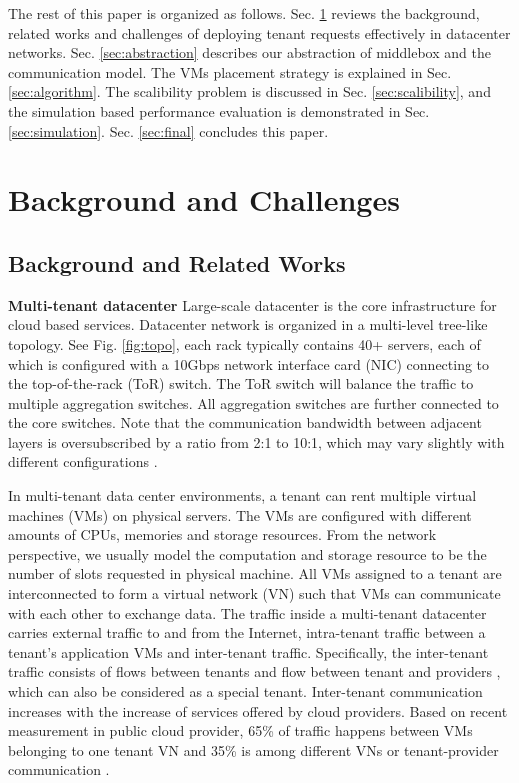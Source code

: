 \documentclass[review]{elsarticle}
\begin{document}
The rest of this paper is organized as follows. Sec. \ref{sec:background} reviews the background, related works and challenges of deploying tenant requests effectively in datacenter networks.
Sec. \ref{sec:abstraction} describes our abstraction of middlebox and the communication model. The VMs placement strategy is explained in Sec. \ref{sec:algorithm}. The scalibility problem is discussed in Sec. \ref{sec:scalibility}, and the simulation based performance evaluation is demonstrated in Sec. \ref{sec:simulation}. Sec. \ref{sec:final} concludes this paper.

\section{Background and Challenges}\label{sec:background}
\subsection{Background and Related Works}
\textbf{Multi-tenant datacenter }
Large-scale datacenter is the core infrastructure for cloud based services. Datacenter network is organized in a multi-level tree-like topology. See Fig. \ref{fig:topo}, each rack typically contains 40+ servers, each of which is configured with a 10Gbps network interface card (NIC) connecting to the top-of-the-rack (ToR) switch. The ToR switch will balance the traffic to multiple aggregation switches. All aggregation switches are further connected to the core switches. Note that the communication bandwidth between adjacent layers is oversubscribed by a ratio from 2:1 to 10:1, which may vary slightly with different configurations \cite{B13cta, williamson2010has}.

In multi-tenant data center environments, a tenant can rent multiple virtual machines (VMs) on physical servers. The VMs are configured with different amounts of CPUs, memories and storage resources. From the network perspective, we usually model the computation and storage resource to be the number of slots requested in physical machine. All VMs assigned to a tenant are interconnected to form a virtual network (VN) such that VMs can communicate with each other to exchange data. The traffic inside a multi-tenant datacenter carries external traffic to and from the Internet, intra-tenant traffic between a tenant's application VMs and inter-tenant traffic. Specifically, the inter-tenant traffic consists of flows between tenants and flow between tenant and providers \cite{B13cta}, which can also be considered as a special tenant. Inter-tenant communication increases with the increase of services offered by cloud providers. Based on recent measurement in public cloud provider, 65\% of traffic happens between VMs belonging to one tenant VN and 35\% is among different VNs or tenant-provider communication \cite{B13cta, P13acs}.
\end{document}
